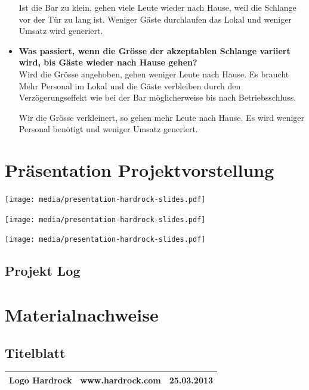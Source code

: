 \documentclass[ngerman,a4paper,12pt]{scrreprt}
\begin{document}
\begin{itemize}
				Ist die Bar zu klein, gehen viele Leute wieder nach Hause, weil die Schlange vor der Tür zu lang ist. Weniger Gäste durchlaufen das Lokal und weniger Umsatz wird generiert.
			\item \textbf{Was passiert, wenn die Grösse der akzeptablen Schlange variiert wird, bis Gäste wieder nach Hause gehen?}\\
				Wird die Grösse angehoben, gehen weniger Leute nach Hause. Es braucht Mehr Personal im Lokal und die Gäste verbleiben durch den Verzögerungseffekt wie bei der Bar möglicherweise bis nach Betriebsschluss.
				
				Wir die Grösse verkleinert, so gehen mehr Leute nach Hause. Es wird weniger Personal benötigt und weniger Umsatz generiert.
		\end{itemize}


\appendix
\chapter{Präsentation Projektvorstellung}
\begin{center}
	\texttt{[image: media/presentation-hardrock-slides.pdf]}
\end{center}
\begin{center}
	\texttt{[image: media/presentation-hardrock-slides.pdf]}
\end{center}
\begin{center}
	\texttt{[image: media/presentation-hardrock-slides.pdf]}
\end{center}
%

\listoffigures

\begin{landscape}
\chapter{Projekt Log}

\end{landscape}

\chapter{Materialnachweise}
\section{Titelblatt}
\begin{tabularx}{\textwidth}{|Xlr|}
		\hline
		Logo Hardrock & www.hardrock.com & 25.03.2013 \\
		\hline
\end{tabularx}
\end{document}
